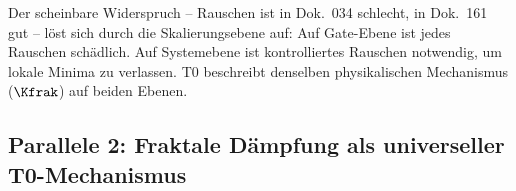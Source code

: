 \begin{table}[h]
    \centering
    \caption{Die gegensätzliche Rolle von Rauschen in beiden Frameworks}
    \label{tab:noise_role}
\end{table}

\begin{important}
    Der scheinbare Widerspruch -- Rauschen ist in Dok.\ 034 schlecht, in Dok.\ 161 gut --
    löst sich durch die Skalierungsebene auf: Auf Gate-Ebene ist jedes Rauschen schädlich.
    Auf Systemebene ist kontrolliertes Rauschen notwendig, um lokale Minima zu verlassen.
    T0 beschreibt denselben physikalischen Mechanismus ($\Kfrak$) auf beiden Ebenen.
\end{important}

\subsection{Parallele 2: Fraktale Dämpfung als universeller T0-Mechanismus}

